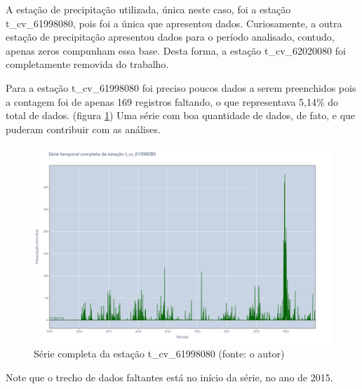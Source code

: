 A estação de precipitação utilizada, única neste caso, foi a estação t\_cv\_61998080, pois foi a única que apresentou dados. Curiosamente, a outra estação de precipitação apresentou dados para o período analisado, contudo, apenas zeros compunham essa base. Desta forma, a estação t\_cv\_62020080 foi completamente removida do trabalho.

Para a estação t\_cv\_61998080 foi preciso poucos dados a serem preenchidos pois a contagem foi de apenas 169 registros faltando, o que representava 5,14\% do total de dados. (figura \ref{fig:rioGrandeSerieImputado_t_cv_61998080}) Uma série com boa quantidade de dados, de fato, e que puderam contribuir com as análises.

\begin{figure}[!h]
\centering
\includegraphics[scale=0.25]{Figuras/rio_grande/rioGrandeSerieImputado_t_cv_61998080.png}
\caption{Série completa da estação t\_cv\_61998080 (fonte: o autor)}
\label{fig:rioGrandeSerieImputado_t_cv_61998080}
\end{figure}

Note que o trecho de dados faltantes está no início da série, no ano de 2015.


